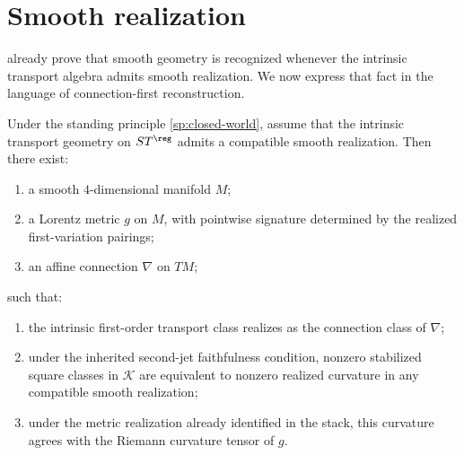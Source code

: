\section{Smooth realization}
\label{sec:connection-smooth-realization}
 already prove that
smooth geometry is recognized
whenever the intrinsic transport algebra admits smooth realization.  We
now express that fact in the language of connection-first
reconstruction.
\begin{theorem}
	\label{thm:connection-smooth-realization}
	Under the standing principle \cref{sp:closed-world}, assume that the
	intrinsic transport geometry on \(ST^{\reg}\) admits a compatible
	smooth realization.  Then there exist:
	\begin{enumerate}[label=\textup{(\roman*)}]
		\item
		      a smooth \(4\)-dimensional manifold \(M\);
		\item
		      a Lorentz metric \(g\) on \(M\), with pointwise signature determined by
		      the realized first-variation pairings;
		\item
		      an affine connection \(\nabla\) on \(TM\);
	\end{enumerate}
	such that:
	\begin{enumerate}[label=\textup{(\alph*)}]
		\item
		      the intrinsic first-order transport class realizes as the connection
		      class of \(\nabla\);
		\item
		      under the inherited second-jet faithfulness condition, nonzero
		      stabilized square classes in \(\mathcal K\) are equivalent to
		      nonzero realized curvature in any compatible smooth realization;
		\item
		      under the metric realization already identified in the stack, this
		      curvature agrees with the Riemann curvature tensor of \(g\).
	\end{enumerate}
\end{theorem}
